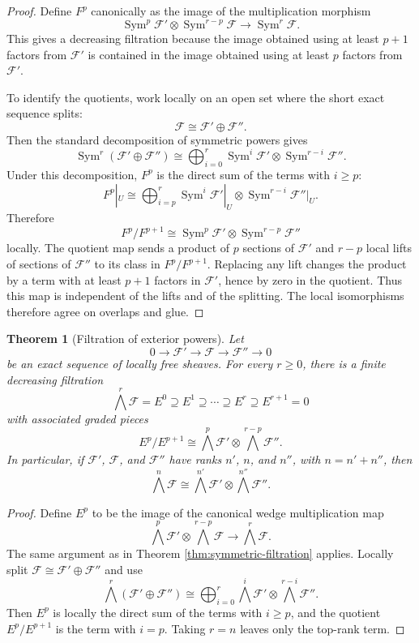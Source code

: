\documentclass[11pt]{amsart}
\DeclareMathOperator{\Sym}{Sym}
\newcommand{\F}{\mathscr F}
\theoremstyle{plain}
\newtheorem{theorem}{Theorem}[section]
\theoremstyle{definition}
\theoremstyle{remark}
\begin{document}
\begin{proof}
Define $F^p$ canonically as the image of the multiplication morphism
\[
  \Sym^p\F'\otimes \Sym^{r-p}\F
  \longrightarrow
  \Sym^r\F.
\]
This gives a decreasing filtration because the image obtained using at least $p+1$ factors from $\F'$ is contained in the image obtained using at least $p$ factors from $\F'$.

To identify the quotients, work locally on an open set where the short exact sequence splits:
\[
  \F \cong \F'\oplus \F''.
\]
Then the standard decomposition of symmetric powers gives
\[
  \Sym^r(\F'\oplus\F'')
  \cong
  \bigoplus_{i=0}^r \Sym^i\F'\otimes \Sym^{r-i}\F''.
\]
Under this decomposition, $F^p$ is the direct sum of the terms with $i\geq p$:
\[
  F^p|_U
  \cong
  \bigoplus_{i=p}^r \Sym^i\F'|_U\otimes \Sym^{r-i}\F''|_U.
\]
Therefore
\[
  F^p/F^{p+1}
  \cong
  \Sym^p\F'\otimes \Sym^{r-p}\F''
\]
locally. The quotient map sends a product of $p$ sections of $\F'$ and $r-p$ local lifts of sections of $\F''$ to its class in $F^p/F^{p+1}$. Replacing any lift changes the product by a term with at least $p+1$ factors in $\F'$, hence by zero in the quotient. Thus this map is independent of the lifts and of the splitting. The local isomorphisms therefore agree on overlaps and glue.
\end{proof}

\begin{theorem}[Filtration of exterior powers]\label{thm:exterior-filtration}
Let
\[
  0\longrightarrow \F'\longrightarrow \F\longrightarrow \F''\longrightarrow 0
\]
be an exact sequence of locally free sheaves.  For every $r\geq 0$, there is a finite decreasing filtration
\[
  \bigwedge^r\F = E^0 \supseteq E^1 \supseteq \cdots \supseteq E^r\supseteq E^{r+1}=0
\]
with associated graded pieces
\[
  E^p/E^{p+1}
  \cong
  \bigwedge^p\F'\otimes \bigwedge^{r-p}\F''.
\]
In particular, if $\F'$, $\F$, and $\F''$ have ranks $n'$, $n$, and $n''$, with $n=n'+n''$, then
\[
  \bigwedge^n\F
  \cong
  \bigwedge^{n'}\F'\otimes \bigwedge^{n''}\F''.
\]
\end{theorem}

\begin{proof}
Define $E^p$ to be the image of the canonical wedge multiplication map
\[
  \bigwedge^p\F'\otimes \bigwedge^{r-p}\F
  \longrightarrow
  \bigwedge^r\F.
\]
The same argument as in Theorem \ref{thm:symmetric-filtration} applies.  Locally split $\F\cong \F'\oplus\F''$ and use
\[
  \bigwedge^r(\F'\oplus\F'')
  \cong
  \bigoplus_{i=0}^r \bigwedge^i\F'\otimes \bigwedge^{r-i}\F''.
\]
Then $E^p$ is locally the direct sum of the terms with $i\geq p$, and the quotient $E^p/E^{p+1}$ is the term with $i=p$.  Taking $r=n$ leaves only the top-rank term.
\end{proof}
\end{document}

